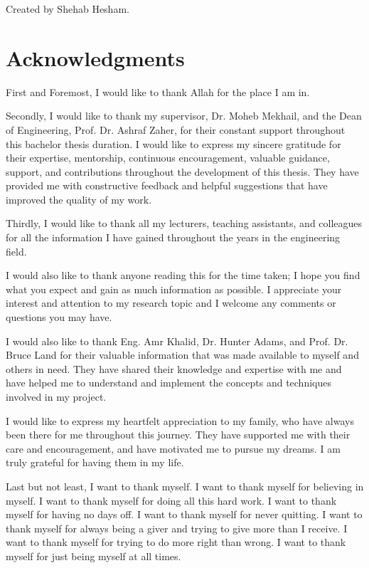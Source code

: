 	Created by Shehab Hesham.
\chapter*{Acknowledgments}

\par First and Foremost, I would like to thank Allah for the place I am in. \newline
\par Secondly, I would like to thank my supervisor, Dr. Moheb Mekhail, and the Dean of Engineering, Prof. Dr. Ashraf Zaher, for their constant support throughout this bachelor thesis duration. I would like to express my sincere gratitude for their expertise, mentorship, continuous encouragement, valuable guidance, support, and contributions throughout the development of this thesis. They have provided me with constructive feedback and helpful suggestions that have improved the quality of my work. \newline
\par Thirdly, I would like to thank all my lecturers, teaching assistants, and colleagues for all the information I have gained throughout the years in the engineering field. \newline %
\par I would also like to thank anyone reading this for the time taken; I hope you find what you expect and gain as much information as possible. I appreciate your interest and attention to my research topic and I welcome any comments or questions you may have. \newline
\par I would also like to thank Eng. Amr Khalid, Dr. Hunter Adams, and Prof. Dr. Bruce Land for their valuable information that was made available to myself and others in need. They have shared their knowledge and expertise with me and have helped me to understand and implement the concepts and techniques involved in my project. \newline
\par I would like to express my heartfelt appreciation to my family, who have always been there for me throughout this journey. They have supported me with their care and encouragement, and have motivated me to pursue my dreams. I am truly grateful for having them in my life. \newline
\par Last but not least, I want to thank myself. I want to thank myself for believing in myself. I want to thank myself for doing all this hard work. I want to thank myself for having no days off. I want to thank myself for never quitting. I want to thank myself for always being a giver and trying to give more than I receive. I want to thank myself for trying to do more right than wrong. I want to thank myself for just being myself at all times. \newline
